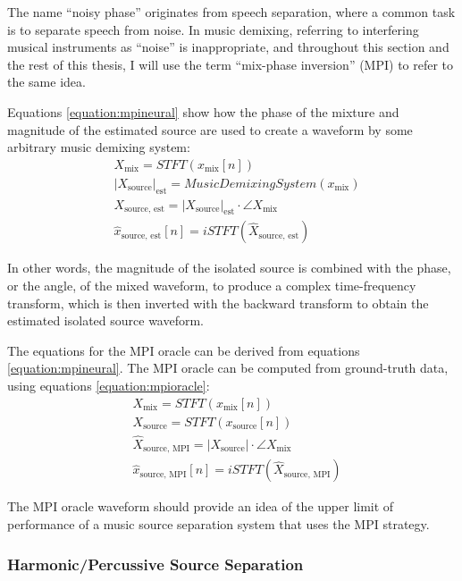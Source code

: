 \documentclass[report.tex]{subfiles}
\begin{document}
The name ``noisy phase'' originates from speech separation, where a common task is to separate speech from noise. In music demixing, referring to interfering musical instruments as ``noise'' is inappropriate, and throughout this section and the rest of this thesis, I will use the term ``mix-phase inversion'' (MPI) to refer to the same idea.

Equations \eqref{equation:mpineural} show how the phase of the mixture and magnitude of the estimated source are used to create a waveform by some arbitrary music demixing system:
\begin{align}\tag{27}\label{equation:mpineural}
	\nonumber & X_{\text{mix}} = \mathit{STFT}(x_{\text{mix}}[n])\\
	\nonumber & {|X_{\text{source}}|}_{\text{est}} = \mathit{MusicDemixingSystem}(x_{\text{mix}})\\
	\nonumber & X_{\text{source, est}} = {|X_{\text{source}}|}_{\text{est}} \cdot \angle{X_{\text{mix}}}\\
	\nonumber & \hat{x}_{\text{source, est}}[n] = \mathit{iSTFT}(\hat{X}_{\text{source, est}})
\end{align}

In other words, the magnitude of the isolated source is combined with the phase, or the angle, of the mixed waveform, to produce a complex time-frequency transform, which is then inverted with the backward transform to obtain the estimated isolated source waveform. 

The equations for the MPI oracle can be derived from equations \eqref{equation:mpineural}. The MPI oracle can be computed from ground-truth data, using equations \eqref{equation:mpioracle}:
\begin{align}\tag{28}\label{equation:mpioracle}
	\nonumber & X_{\text{mix}} = \mathit{STFT}(x_{\text{mix}}[n])\\
	\nonumber & X_{\text{source}} = \mathit{STFT}(x_{\text{source}}[n])\\
	\nonumber & \hat{X}_{\text{source, MPI}} = |X_{\text{source}}| \cdot \angle{X_{\text{mix}}}\\
	\nonumber & \hat{x}_{\text{source, MPI}}[n] = \mathit{iSTFT}(\hat{X}_{\text{source, MPI}})
\end{align}

The MPI oracle waveform should provide an idea of the upper limit of performance of a music source separation system that uses the MPI strategy.

\subsubsection{Harmonic/Percussive Source Separation}
\label{sec:hpss}
\end{document}
